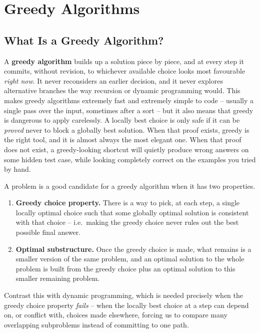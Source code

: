\chapter{Greedy Algorithms}

\section{What Is a Greedy Algorithm?}

A \textbf{greedy algorithm} builds up a solution piece by piece, and at every step
it commits, without revision, to whichever available choice looks most
favourable \emph{right now}. It never reconsiders an earlier decision, and it
never explores alternative branches the way recursion or dynamic programming
would. This makes greedy algorithms extremely fast and extremely simple to
code -- usually a single pass over the input, sometimes after a sort -- but it
also means that greedy is dangerous to apply carelessly. A locally best choice
is only safe if it can be \emph{proved} never to block a globally best
solution. When that proof exists, greedy is the right tool, and it is almost
always the most elegant one. When that proof does not exist, a greedy-looking
shortcut will quietly produce wrong answers on some hidden test case, while
looking completely correct on the examples you tried by hand.

\begin{ideabox}
A problem is a good candidate for a greedy algorithm when it has two
properties.
\begin{enumerate}
  \item \textbf{Greedy choice property.} There is a way to pick, at each step,
        a single locally optimal choice such that some globally optimal
        solution is consistent with that choice -- i.e.\ making the greedy
        choice never rules out the best possible final answer.
  \item \textbf{Optimal substructure.} Once the greedy choice is made, what
        remains is a smaller version of the same problem, and an optimal
        solution to the whole problem is built from the greedy choice plus an
        optimal solution to this smaller remaining problem.
\end{enumerate}
Contrast this with dynamic programming, which is needed precisely when the
greedy choice property \emph{fails} -- when the locally best choice at a step
can depend on, or conflict with, choices made elsewhere, forcing us to compare
many overlapping subproblems instead of committing to one path.
\end{ideabox}


